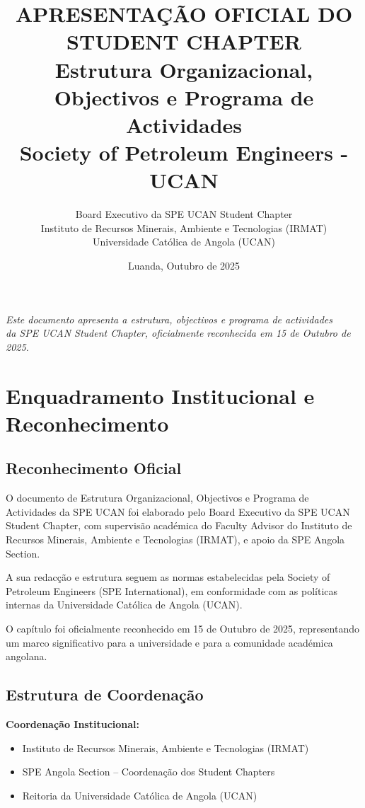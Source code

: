 \documentclass[12pt]{article}
\title{\textbf{APRESENTAÇÃO OFICIAL DO STUDENT CHAPTER}\\[0.5em]
\large Estrutura Organizacional, Objectivos e Programa de Actividades\\[0.2em]
\normalsize Society of Petroleum Engineers - UCAN}
\author{Board Executivo da SPE UCAN Student Chapter\\
Instituto de Recursos Minerais, Ambiente e Tecnologias (IRMAT)\\
Universidade Católica de Angola (UCAN)}
\date{Luanda, Outubro de 2025}
\begin{document}
\maketitle

\begin{center}
\textit{Este documento apresenta a estrutura, objectivos e programa de actividades\\
da SPE UCAN Student Chapter, oficialmente reconhecida em 15 de Outubro de 2025.}
\end{center}

\newpage
\tableofcontents
\newpage

\section{Enquadramento Institucional e Reconhecimento}

\subsection{Reconhecimento Oficial}

O documento de Estrutura Organizacional, Objectivos e Programa de Actividades da SPE UCAN foi elaborado pelo Board Executivo da SPE UCAN Student Chapter, com supervisão académica do Faculty Advisor do Instituto de Recursos Minerais, Ambiente e Tecnologias (IRMAT), e apoio da SPE Angola Section.

A sua redacção e estrutura seguem as normas estabelecidas pela Society of Petroleum Engineers (SPE International), em conformidade com as políticas internas da Universidade Católica de Angola (UCAN).

O capítulo foi oficialmente reconhecido em 15 de Outubro de 2025, representando um marco significativo para a universidade e para a comunidade académica angolana.

\subsection{Estrutura de Coordenação}

\noindent\textbf{Coordenação Institucional:}
\begin{itemize}
    \item Instituto de Recursos Minerais, Ambiente e Tecnologias (IRMAT)
    \item SPE Angola Section -- Coordenação dos Student Chapters
    \item Reitoria da Universidade Católica de Angola (UCAN)
\end{itemize}
\end{document}
